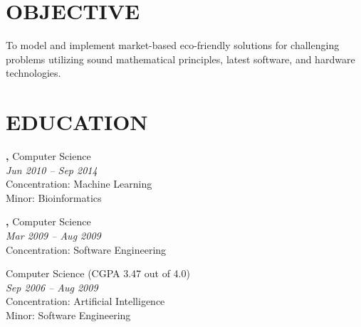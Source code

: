 \documentclass[margin, 10pt]{res} %
\begin{document}
\begin{resume}

 
\section{OBJECTIVE}  

To model and implement market-based eco-friendly solutions for challenging problems utilizing sound mathematical principles, latest software, and hardware technologies.



\section{EDUCATION}

{\bf \color{Black}{Doctor of Philosophy},} Computer Science \\
{} \hfill \textit{Jun 2010 -- Sep 2014} \\
Concentration: Machine Learning \\
Minor: Bioinformatics 

{\bf \color{Black}{Exchange Student},} Computer Science \\
{\color{RubineRed}{University of Limerick, Ireland}} \hfill \textit{Mar 2009 -- Aug 2009} \\
Concentration: Software Engineering 

{\bf \color{Black}{Master of Science,}} Computer Science (CGPA 3.47 out of 4.0) \\
{\color{RubineRed}{Lahore University of Management Sciences (LUMS), Pakistan}} \hfill \textit{Sep 2006 -- Aug 2009} \\
Concentration: Artificial Intelligence \\
Minor: Software Engineering


\end{resume}
\end{document}
